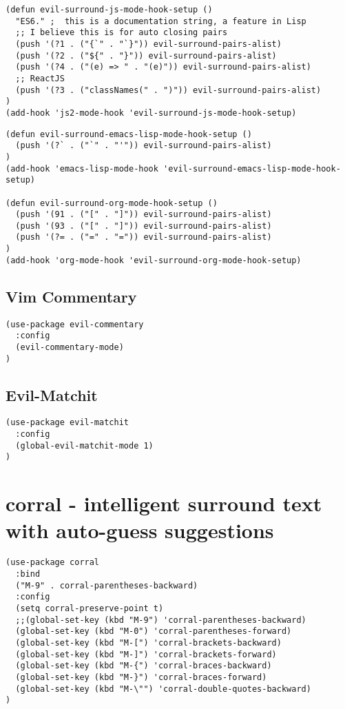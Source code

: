 \documentclass[11pt]{article}
\begin{document}
\begin{verbatim}
(defun evil-surround-js-mode-hook-setup ()
  "ES6." ;  this is a documentation string, a feature in Lisp
  ;; I believe this is for auto closing pairs
  (push '(?1 . ("{`" . "`}")) evil-surround-pairs-alist)
  (push '(?2 . ("${" . "}")) evil-surround-pairs-alist)
  (push '(?4 . ("(e) => " . "(e)")) evil-surround-pairs-alist)
  ;; ReactJS
  (push '(?3 . ("classNames(" . ")")) evil-surround-pairs-alist)
)
(add-hook 'js2-mode-hook 'evil-surround-js-mode-hook-setup)
\end{verbatim}

\begin{verbatim}
(defun evil-surround-emacs-lisp-mode-hook-setup ()
  (push '(?` . ("`" . "'")) evil-surround-pairs-alist)
)
(add-hook 'emacs-lisp-mode-hook 'evil-surround-emacs-lisp-mode-hook-setup)

(defun evil-surround-org-mode-hook-setup ()
  (push '(91 . ("[" . "]")) evil-surround-pairs-alist)
  (push '(93 . ("[" . "]")) evil-surround-pairs-alist)
  (push '(?= . ("=" . "=")) evil-surround-pairs-alist)
)
(add-hook 'org-mode-hook 'evil-surround-org-mode-hook-setup)
\end{verbatim}


\subsection*{Vim Commentary}
\label{sec:org6a27f70}

\begin{verbatim}
(use-package evil-commentary
  :config
  (evil-commentary-mode)
)
\end{verbatim}

\subsection*{Evil-Matchit}
\label{sec:orgbb6c468}
\begin{verbatim}
(use-package evil-matchit
  :config
  (global-evil-matchit-mode 1)
)
\end{verbatim}

\section*{corral - intelligent surround text with auto-guess suggestions}
\label{sec:orgc89889d}
\begin{verbatim}
(use-package corral
  :bind
  ("M-9" . corral-parentheses-backward)
  :config
  (setq corral-preserve-point t)
  ;;(global-set-key (kbd "M-9") 'corral-parentheses-backward)
  (global-set-key (kbd "M-0") 'corral-parentheses-forward)
  (global-set-key (kbd "M-[") 'corral-brackets-backward)
  (global-set-key (kbd "M-]") 'corral-brackets-forward)
  (global-set-key (kbd "M-{") 'corral-braces-backward)
  (global-set-key (kbd "M-}") 'corral-braces-forward)
  (global-set-key (kbd "M-\"") 'corral-double-quotes-backward)
)
\end{verbatim}
\end{document}

